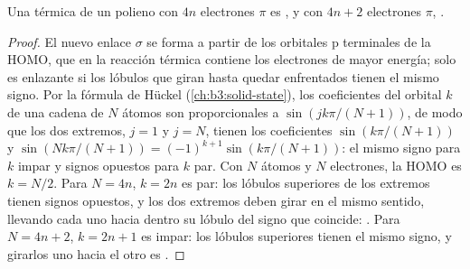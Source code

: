 \begin{theorem}\label{thm:b3:pericyclic:electrocyclic}
Una  térmica de un polieno con $4n$ electrones $\pi$ es
, y con $4n + 2$ electrones $\pi$, .
\end{theorem}

\begin{proof}
El nuevo enlace $\sigma$ se forma a partir de los orbitales p terminales de la HOMO, que en la
reacción térmica contiene los electrones de mayor energía; solo es enlazante si los
lóbulos que giran hasta quedar enfrentados tienen el mismo signo. Por la fórmula de Hückel
(\cref{ch:b3:solid-state}), los coeficientes del orbital $k$ de una cadena de $N$ átomos son
proporcionales a $\sin(jk\pi/(N + 1))$, de modo que los dos extremos, $j = 1$ y $j = N$, tienen los
coeficientes $\sin(k\pi/(N + 1))$ y $\sin(Nk\pi/(N + 1)) = (-1)^{k+1}\sin(k\pi/(N + 1))$: el mismo signo para $k$ impar y
signos opuestos para $k$ par. Con $N$ átomos y $N$ electrones, la HOMO es
$k = N/2$. Para $N = 4n$, $k = 2n$ es par: los lóbulos superiores de los extremos tienen signos
opuestos, y los dos extremos deben girar en el mismo sentido, llevando cada uno hacia dentro su lóbulo
del signo que coincide: . Para $N = 4n + 2$, $k = 2n + 1$ es impar: los lóbulos superiores
tienen el mismo signo, y girarlos uno hacia el otro es .
\end{proof}

